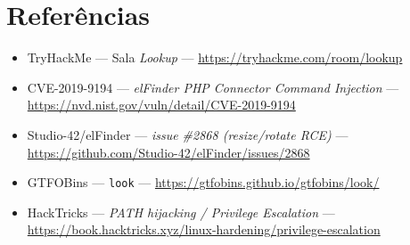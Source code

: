 \documentclass[12pt,a4paper]{article}
\begin{document}
\section{Referências}
\begin{itemize}[leftmargin=1.5em]
  \item TryHackMe --- Sala \emph{Lookup} ---
        \url{https://tryhackme.com/room/lookup}
  \item CVE-2019-9194 --- \emph{elFinder PHP Connector Command Injection} ---
        \url{https://nvd.nist.gov/vuln/detail/CVE-2019-9194}
  \item Studio-42/elFinder --- \emph{issue \#2868 (resize/rotate RCE)} ---
        \url{https://github.com/Studio-42/elFinder/issues/2868}
  \item GTFOBins --- \texttt{look} ---
        \url{https://gtfobins.github.io/gtfobins/look/}
  \item HackTricks --- \emph{PATH hijacking / Privilege Escalation} ---
        \url{https://book.hacktricks.xyz/linux-hardening/privilege-escalation}
\end{itemize}
\end{document}
